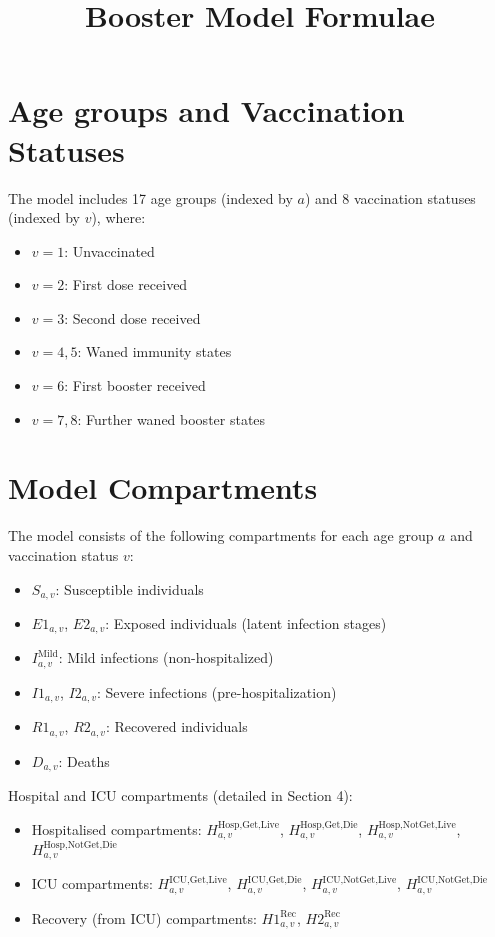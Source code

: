 \documentclass[12pt]{article}
\title{Booster Model Formulae}
\date{}
\begin{document}
\maketitle

\section{Age groups and Vaccination Statuses}
The model includes 17 age groups (indexed by $a$) and 8 vaccination statuses (indexed by $v$), where:
\begin{itemize}
    \item $v = 1$: Unvaccinated
    \item $v = 2$: First dose received
    \item $v = 3$: Second dose received
    \item $v = 4, 5$: Waned immunity states
    \item $v = 6$: First booster received
    \item $v = 7, 8$: Further waned booster states
\end{itemize}

\section{Model Compartments}

The model consists of the following compartments for each age group $a$ and vaccination status $v$:

\begin{itemize}
    \item $S_{a,v}$: Susceptible individuals
    \item $E1_{a,v}$, $E2_{a,v}$: Exposed individuals (latent infection stages)
    \item $I^{\text{Mild}}_{a,v}$: Mild infections (non-hospitalized)
    \item $I1_{a,v}$, $I2_{a,v}$: Severe infections (pre-hospitalization)
    \item $R1_{a,v}$, $R2_{a,v}$: Recovered individuals
    \item $D_{a,v}$: Deaths
\end{itemize}

Hospital and ICU compartments (detailed in Section 4):

\begin{itemize}
    \item Hospitalised compartments: $H^{\text{Hosp,Get,Live}}_{a,v}$, $H^{\text{Hosp,Get,Die}}_{a,v}$, $H^{\text{Hosp,NotGet,Live}}_{a,v}$, $H^{\text{Hosp,NotGet,Die}}_{a,v}$
    \item ICU compartments: $H^{\text{ICU,Get,Live}}_{a,v}$, $H^{\text{ICU,Get,Die}}_{a,v}$, $H^{\text{ICU,NotGet,Live}}_{a,v}$, $H^{\text{ICU,NotGet,Die}}_{a,v}$
    \item Recovery (from ICU) compartments: $H1^{\text{Rec}}_{a,v}$, $H2^{\text{Rec}}_{a,v}$
\end{itemize}
\end{document}
